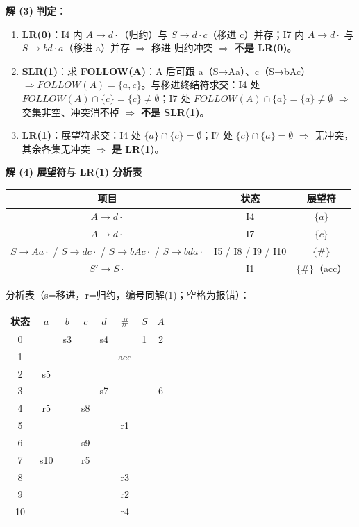 \documentclass[12pt,a4paper,fontset=windows]{ctexart}
\newcommand{\imp}{\ensuremath{\Rightarrow}}
\begin{document}
\textbf{解 (3) 判定}：
\begin{enumerate}
\item \textbf{LR(0)}：I4 内 $A \to d\cdot$（归约）与 $S \to d\cdot c$（移进 c）并存；I7 内 $A \to d\cdot$ 与 $S \to bd\cdot a$（移进 a）并存 \imp{} 移进-归约冲突 \imp{} \textbf{不是 LR(0)}。
\item \textbf{SLR(1)}：求 \textbf{FOLLOW(A)}：A 后可跟 a（S→Aa）、c（S→bAc）$\Rightarrow FOLLOW(A)=\{a,c\}$。与移进终结符求交：I4 处 $FOLLOW(A) \cap \{c\} = \{c\} \neq \emptyset$；I7 处 $FOLLOW(A) \cap \{a\} = \{a\} \neq \emptyset$ \imp{} 交集非空、冲突消不掉 \imp{} \textbf{不是 SLR(1)}。
\item \textbf{LR(1)}：展望符求交：I4 处 $\{a\} \cap \{c\} = \emptyset$；I7 处 $\{c\} \cap \{a\} = \emptyset$ \imp{} 无冲突，其余各集无冲突 \imp{} \textbf{是 LR(1)}。
\end{enumerate}

\textbf{解 (4) 展望符与 LR(1) 分析表}

\begin{center}
\renewcommand{\arraystretch}{1.25}
\begin{tabular}{c c c}
\toprule
\textbf{项目} & \textbf{状态} & \textbf{展望符} \\
\midrule
$A \to d\cdot$ & I4 & $\{a\}$ \\
$A \to d\cdot$ & I7 & $\{c\}$ \\
$S \to Aa\cdot$ / $S \to dc\cdot$ / $S \to bAc\cdot$ / $S \to bda\cdot$ & I5 / I8 / I9 / I10 & $\{\#\}$ \\
$S' \to S\cdot$ & I1 & $\{\#\}$（acc） \\
\bottomrule
\end{tabular}
\end{center}

分析表（s=移进，r=归约，编号同解(1)；空格为报错）：

\begin{center}
\renewcommand{\arraystretch}{1.3}
\begin{tabular}{c|ccccccc}
\toprule
状态 & $a$ & $b$ & $c$ & $d$ & $\#$ & $S$ & $A$ \\
\midrule
0 &  & s3 &  & s4 &  & 1 & 2 \\
1 &  &  &  &  & acc &  &  \\
2 & s5 &  &  &  &  &  &  \\
3 &  &  &  & s7 &  &  & 6 \\
4 & r5 &  & s8 &  &  &  &  \\
5 &  &  &  &  & r1 &  &  \\
6 &  &  & s9 &  &  &  &  \\
7 & s10 &  & r5 &  &  &  &  \\
8 &  &  &  &  & r3 &  &  \\
9 &  &  &  &  & r2 &  &  \\
10 &  &  &  &  & r4 &  &  \\
\bottomrule
\end{tabular}
\end{center}
\end{document}
